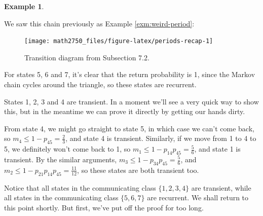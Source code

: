 \documentclass[
  a4paper,
]{article}
\theoremstyle{definition}
\theoremstyle{definition}
\newtheorem{example}{Example}[section]
\theoremstyle{definition}
\theoremstyle{remark}
\begin{document}
\begin{example}
\protect\hypertarget{exm:rec}{}\label{exm:rec}

We saw this chain previously as Example \ref{exm:weird-period}:

\begin{figure}

{\centering \texttt{[image: math2750\_files/figure-latex/periods-recap-1]} 

}

\caption{Transition diagram from Subsection 7.2.}\label{fig:periods-recap}
\end{figure}

For states 5, 6 and 7, it's clear that the return probability is 1, since the Markov chain cycles around the triangle, so these states are recurrent.

States 1, 2, 3 and 4 are transient. In a moment we'll see a very quick way to show this, but in the meantime we can prove it directly by getting our hands dirty.

From state 4, we might go straight to state 5, in which case we can't come back, so \(m_4 \leq 1 - p_{45} = \frac23\), and state 4 is transient. Similarly, if we move from 1 to 4 to 5, we definitely won't come back to 1, so \(m_1 \leq 1 - p_{14}p_{45} = \frac56\), and state 1 is transient. By the similar arguments, \(m_3 \leq 1 - p_{34}p_{45} = \frac56\), and \(m_2 \leq 1 - p_{21}p_{14}p_{45} = \frac{11}{12}\), so these states are both transient too.

\end{example}

Notice that all states in the communicating class \(\{1,2,3,4\}\) are transient, while all states in the communicating class \(\{5,6,7\}\) are recurrent. We shall return to this point shortly. But first, we've put off the proof for too long.
\end{document}
